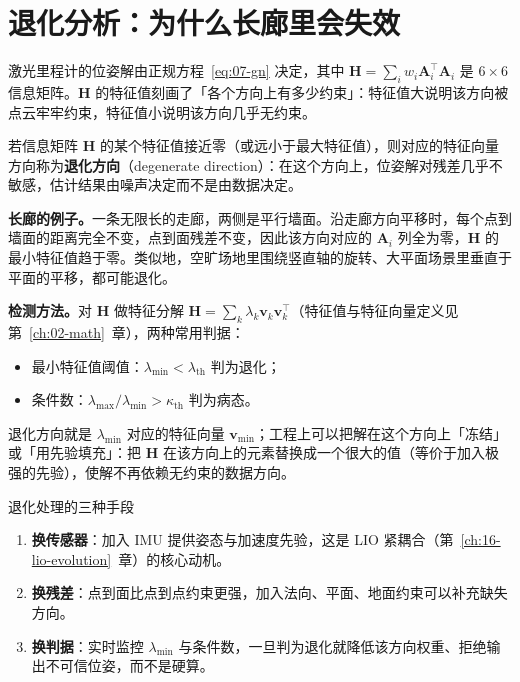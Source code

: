 \section{退化分析：为什么长廊里会失效}\label{sec:07-degeneracy}

激光里程计的位姿解由正规方程~\eqref{eq:07-gn} 决定，其中 $\bm{H}=\sum_i w_i\bm{A}_i^{\top}\bm{A}_i$ 是 $6\times6$ 信息矩阵。$\bm{H}$ 的特征值刻画了「各个方向上有多少约束」：特征值大说明该方向被点云牢牢约束，特征值小说明该方向几乎无约束。

\begin{definition}[退化]
若信息矩阵 $\bm{H}$ 的某个特征值接近零（或远小于最大特征值），则对应的特征向量方向称为\textbf{退化方向}（degenerate direction）：在这个方向上，位姿解对残差几乎不敏感，估计结果由噪声决定而不是由数据决定。
\end{definition}

\textbf{长廊的例子。}一条无限长的走廊，两侧是平行墙面。沿走廊方向平移时，每个点到墙面的距离完全不变，点到面残差不变，因此该方向对应的 $\bm{A}_i$ 列全为零，$\bm{H}$ 的最小特征值趋于零。类似地，空旷场地里围绕竖直轴的旋转、大平面场景里垂直于平面的平移，都可能退化。

\textbf{检测方法。}对 $\bm{H}$ 做特征分解 $\bm{H}=\sum_k\lambda_k\bm{v}_k\bm{v}_k^{\top}$（特征值与特征向量定义见第~\ref{ch:02-math}~章），两种常用判据：
\begin{itemize}
  \item 最小特征值阈值：$\lambda_{\min}<\lambda_{\text{th}}$ 判为退化；
  \item 条件数：$\lambda_{\max}/\lambda_{\min}>\kappa_{\text{th}}$ 判为病态。
\end{itemize}
退化方向就是 $\lambda_{\min}$ 对应的特征向量 $\bm{v}_{\min}$；工程上可以把解在这个方向上「冻结」或「用先验填充」：把 $\bm{H}$ 在该方向上的元素替换成一个很大的值（等价于加入极强的先验），使解不再依赖无约束的数据方向。

\begin{keybox}{退化处理的三种手段}
\begin{enumerate}
  \item \textbf{换传感器}：加入 IMU 提供姿态与加速度先验，这是 LIO 紧耦合（第~\ref{ch:16-lio-evolution}~章）的核心动机。
  \item \textbf{换残差}：点到面比点到点约束更强，加入法向、平面、地面约束可以补充缺失方向。
  \item \textbf{换判据}：实时监控 $\lambda_{\min}$ 与条件数，一旦判为退化就降低该方向权重、拒绝输出不可信位姿，而不是硬算。
\end{enumerate}
\end{keybox}

